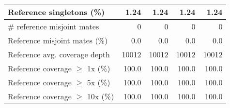 \documentclass[12pt,a4paper]{article}
\begin{document}
\begin{table}[ht]
\begin{center}
\begin{tabular}{|l*{4}{|r}|}
Reference singletons (\%) & 1.24 & 1.24 & 1.24 & 1.24 \\ \hline
\# reference misjoint mates & 0 & 0 & 0 & 0 \\ \hline
Reference misjoint mates (\%) & 0.0 & 0.0 & 0.0 & 0.0 \\ \hline
Reference avg. coverage depth & 10012 & 10012 & 10012 & 10012 \\ \hline
Reference coverage $\geq$ 1x (\%) & 100.0 & 100.0 & 100.0 & 100.0 \\ \hline
Reference coverage $\geq$ 5x (\%) & 100.0 & 100.0 & 100.0 & 100.0 \\ \hline
Reference coverage $\geq$ 10x (\%) & 100.0 & 100.0 & 100.0 & 100.0 \\ \hline
\end{tabular}
\end{center}
\end{table}
\end{document}
